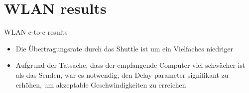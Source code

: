 \documentclass[10pt]{beamer}
\begin{document}
\section{WLAN results}

\begin{frame}[fragile]{WLAN c-to-c results}
  \begin{itemize}
  	\footnotesize 	
    \item{} Die Übertragungsrate durch das Shuttle ist um ein Vielfaches niedriger
    \item{} Aufgrund der Tatsache, dass der empfangende Computer viel schwächer ist als das Senden, war es notwendig, den Delay-parameter signifikant zu erhöhen, um akzeptable Geschwindigkeiten zu erreichen
  \end{itemize}
\end{frame}
\end{document}
